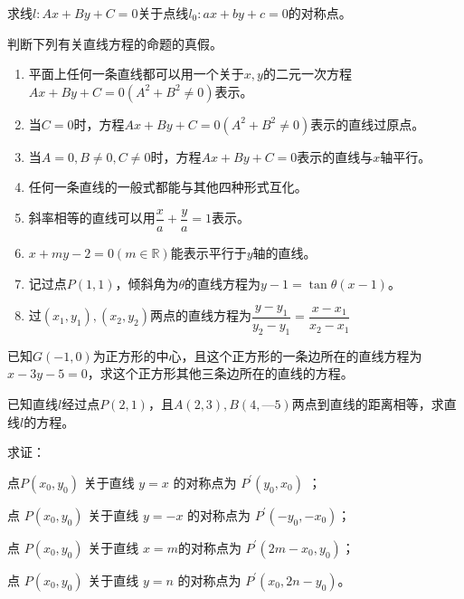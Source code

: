 \begin{example}
    求线\(l:Ax+By+C=0\)关于点线\(l_0:ax+by+c=0\)的对称点。
\end{example}






\clearpage
\review

\clearpage

\hw
\begin{homework}
    判断下列有关直线方程的命题的真假。
    \begin{enumerate}[(1)]
        \setlength{\itemsep}{-\itemsep}
        \item 平面上任何一条直线都可以用一个关于\(x,y\)的二元一次方程\(Ax+By+C=0(A^2+B^2\neq 0)\)表示。
        \item 当\(C=0\)时，方程\(Ax+By+C=0(A^2+B^2\neq 0)\)表示的直线过原点。
        \item 当\(A=0,B\neq 0,C\neq 0\)时，方程\(Ax+By+C=0\)表示的直线与\(x\)轴平行。
        \item 任何一条直线的一般式都能与其他四种形式互化。
        \item 斜率相等的直线可以用\(\dfrac{x}{a}+\dfrac{y}{a}=1\)表示。
        \item \(x+my-2=0(m\in\mathbb{R})\)能表示平行于\(y\)轴的直线。
        \item 记过点\(P(1,1)\)，倾斜角为\(\theta\)的直线方程为\(y-1=\tan\theta(x-1)\)。
        \item 过\((x_1,y_1),(x_2,y_2)\)两点的直线方程为\(\dfrac{y-y_{1}}{y_{2}-y_{1}}=\dfrac{x-x_{1}}{x_{2}-x_{1}}\)
    \end{enumerate}
\end{homework}
\begin{homework}
已知$G(-1,0)$为正方形的中心，且这个正方形的一条边所在的直线方程为
$x-3y-5=0$，求这个正方形其他三条边所在的直线的方程。

\end{homework}
\begin{homework}
    已知直线\(l\)经过点$P(2,1)$，且$A(2,3),B(4,—5)$两点到直线的距离相等，求直线\(l\)的方程。
\end{homework}
\begin{homework}

\end{homework}
\begin{homework}求证：
    
    点$  P\left(x_{0}, y_{0}\right)$  关于直线 $ y=x $ 的对称点为 $ P^{\prime}\left(y_{0}, x_{0}\right)$ ；

 点  $P\left(x_{0}, y_{0}\right) $ 关于直线 $ y=-x $ 的对称点为 $ P^{\prime}\left(-y_{0},-x_{0}\right) $；

 点  $P\left(x_{0}, y_{0}\right) $ 关于直线 $ x=m $的对称点为 $ P^{\prime}\left(2 m-x_{0}, y_{0}\right) $；

 点 $ P\left(x_{0}, y_{0}\right) $ 关于直线 $ y=n $ 的对称点为 $ P^{\prime}\left(x_{0}, 2 n-y_{0}\right) $。
\end{homework}
